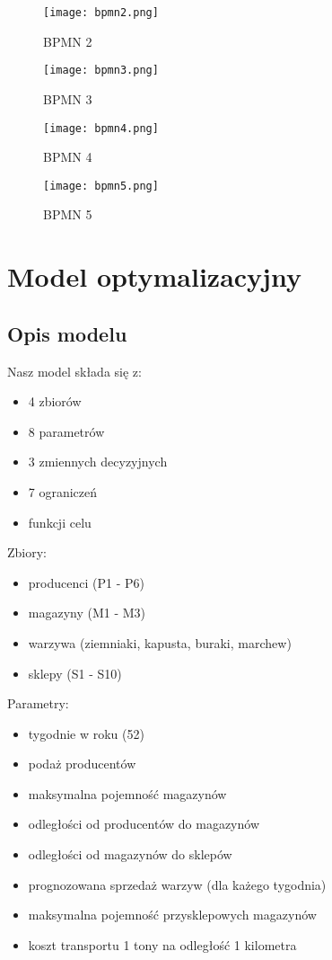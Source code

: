 \documentclass{article}
\begin{document}
\begin{figure}[H]
\caption{BPMN 2}
\centering
\texttt{[image: bpmn2.png]}
\end{figure}

\begin{figure}[H]
\caption{BPMN 3}
\centering
\texttt{[image: bpmn3.png]}
\end{figure}

\begin{figure}[H]
\caption{BPMN 4}
\centering
\texttt{[image: bpmn4.png]}
\end{figure}

\begin{figure}[H]
\caption{BPMN 5}
\centering
\texttt{[image: bpmn5.png]}
\end{figure}




\section{Model optymalizacyjny}

\subsection{Opis modelu}

Nasz model składa się z:

\begin{itemize}
   \item 4 zbiorów
   \item 8 parametrów
   \item 3 zmiennych decyzyjnych
   \item 7 ograniczeń
   \item funkcji celu
 \end{itemize}
 
Zbiory:
\begin{itemize}
   \item producenci (P1 - P6)
   \item magazyny (M1 - M3)
   \item warzywa (ziemniaki, kapusta, buraki, marchew)
   \item sklepy (S1 - S10)
 \end{itemize}
 
Parametry:
\begin{itemize}
   \item tygodnie w roku (52)
   \item podaż producentów
   \item maksymalna pojemność magazynów
   \item odległości od producentów do magazynów
   \item odległości od magazynów do sklepów
   \item prognozowana sprzedaż warzyw (dla każego tygodnia)
   \item maksymalna pojemność przysklepowych magazynów
   \item koszt transportu 1 tony na odległość 1 kilometra
 \end{itemize}
 
\end{document}
